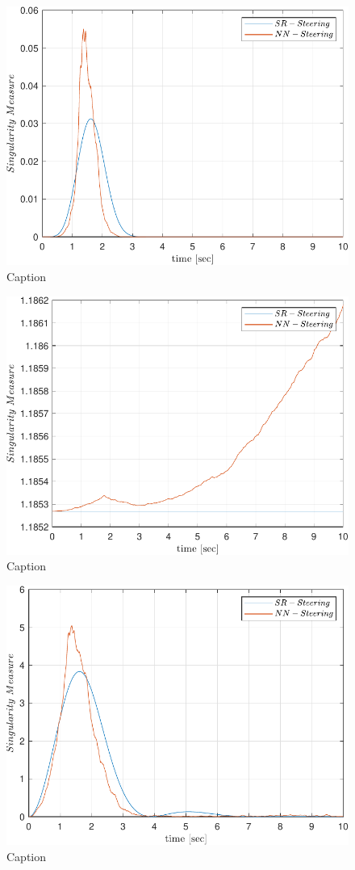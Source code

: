 \begin{figure}
    \centering
    \includegraphics[width=\textwidth]{figures/plots/Results/vs-vs-CC.pdf}
    \caption{Caption}
    \label{fig:my_CC}
\end{figure}

\begin{figure}
    \centering
    \includegraphics[width=\textwidth]{figures/plots/Results/vs-vs-DD.pdf}
    \caption{Caption}
    \label{fig:my_DD}
\end{figure}

\begin{figure}
    \centering
    \includegraphics[width=\textwidth]{figures/plots/Results/vs-vs-QQ.pdf}
    \caption{Caption}
    \label{fig:my_QQ}
\end{figure}